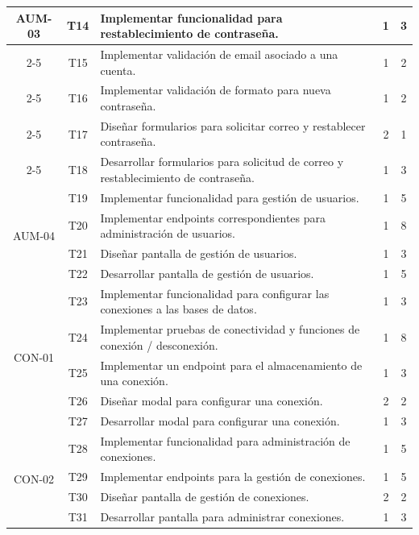 \begin{longtable}[c]{|c|c|m{}|c|c|}
    \multirow{5}{*}{AUM-03} & T14 & Implementar funcionalidad para restablecimiento de contraseña. & 1 & 3 \\
    \cline{2-5}
     & T15 & Implementar validación de email asociado a una cuenta. & 1 & 2 \\
    \cline{2-5}
     & T16 & Implementar validación de formato para nueva contraseña. & 1 & 2 \\
    \cline{2-5}
     & T17 & Diseñar formularios para solicitar correo y restablecer contraseña. & 2 & 1 \\
    \cline{2-5}
     & T18 & Desarrollar formularios para solicitud de correo y restablecimiento de contraseña. & 1 & 3 \\
    \hline
    
    \multirow{4}{*}{AUM-04} & T19 & Implementar funcionalidad para gestión de usuarios. & 1 & 5 \\
    \cline{2-5}
     & T20 & Implementar endpoints correspondientes para administración de usuarios. & 1 & 8 \\
    \cline{2-5}
     & T21 & Diseñar pantalla de gestión de usuarios. & 1 & 3 \\
    \cline{2-5}
     & T22 & Desarrollar pantalla de gestión de usuarios. & 1 & 5 \\
    \hline


    \multirow{5}{*}{CON-01} & T23 & Implementar funcionalidad para configurar las conexiones a las bases de datos. & 1 & 3 \\
    \cline{2-5}
     & T24 & Implementar pruebas de conectividad y funciones de conexión / desconexión. & 1 & 8 \\
    \cline{2-5}
     & T25 & Implementar un endpoint para el almacenamiento de una conexión. & 1 & 3 \\
    \cline{2-5}
     & T26 & Diseñar modal para configurar una conexión. & 2 & 2 \\
    \cline{2-5}
     & T27 & Desarrollar modal para configurar una conexión. & 1 & 3 \\
    \hline
    
    \multirow{4}{*}{CON-02} & T28 & Implementar funcionalidad para administración de conexiones. & 1 & 5 \\
    \cline{2-5}
     & T29 & Implementar endpoints para la gestión de conexiones. & 1 & 5 \\
    \cline{2-5}
     & T30 & Diseñar pantalla de gestión de conexiones. & 2 & 2 \\
    \cline{2-5}
     & T31 & Desarrollar pantalla para administrar conexiones. & 1 & 3 \\
    \hline
    


\end{longtable}

